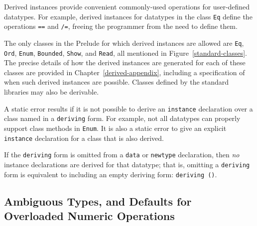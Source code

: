 Derived instances provide convenient commonly-used operations for
user-de\-fined da\-ta\-types.  For example, derived instances for datatypes
in the class \mbox{\tt Eq} define the operations \mbox{\tt ==} and \mbox{\tt /=}, freeing the
programmer from the need to define them.

The only classes in the Prelude for
which derived instances are allowed are
\mbox{\tt Eq},
\mbox{\tt Ord},
\mbox{\tt Enum},
\mbox{\tt Bounded},
\mbox{\tt Show},
and \mbox{\tt Read},
all mentioned in Figure~\ref{standard-classes}.
The
precise details of how the derived instances are generated for each of
these classes are provided in Chapter~\ref{derived-appendix}, including
a specification of when such derived instances are possible. 
Classes defined by the standard libraries may also be derivable.

A static error results if it is not possible to derive an \mbox{\tt instance}
declaration over a class named in a \mbox{\tt deriving} form.  For example,
not all datatypes can properly support class methods in
\mbox{\tt Enum}.  It is 
also a static error to give an explicit \mbox{\tt instance} declaration for
a class that is also derived.

If the \mbox{\tt deriving} form is omitted from a \mbox{\tt data} or \mbox{\tt newtype}
declaration, then {\em no} instance declarations
are derived for 
that datatype; that is, omitting a \mbox{\tt deriving} form is equivalent to
including an empty deriving form: \mbox{\tt deriving\ ()}.



\subsection{Ambiguous Types, and Defaults for Overloaded Numeric Operations}
\label{default-decls}

